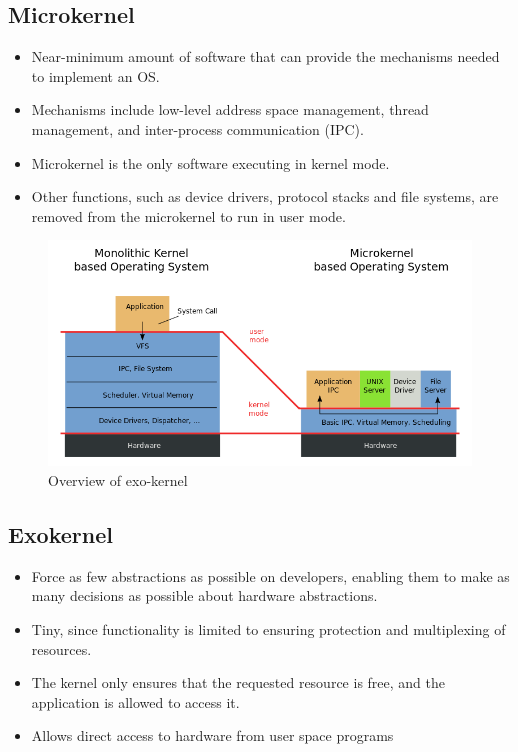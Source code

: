 \documentclass{article}
\begin{document}
\subsection{Microkernel}
\begin{itemize}
\item Near-minimum amount of software that can provide the mechanisms needed to implement an OS.
\item Mechanisms include low-level address space management, thread management, and inter-process communication (IPC).
\item Microkernel is the only software executing in kernel mode.
\item Other functions, such as device drivers, protocol stacks and file systems, are removed from the microkernel to run in user mode.
\end{itemize}

\begin{figure}[H]
  \centering
  \includegraphics[scale=0.5]{images/mono-microkernel.png}
  \caption[Caption for LOF]{Overview of exo-kernel\footnotemark}
\end{figure}

\subsection{Exokernel}
\begin{itemize}
\item Force as few abstractions as possible on developers, enabling them to make as many decisions as possible about hardware abstractions.

\item Tiny, since functionality is limited to ensuring protection and multiplexing of resources.

\item The kernel only ensures that the requested resource is free, and the application is allowed to access it.

\item Allows direct access to hardware from user space programs
\end{itemize}
\end{document}
